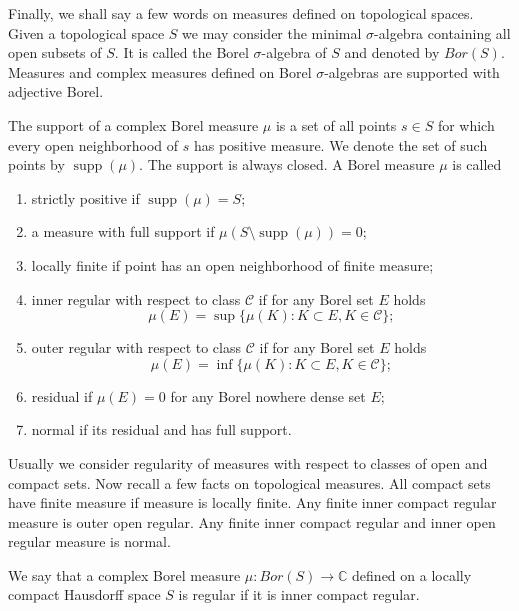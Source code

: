 Finally, we shall say a few words on measures defined on topological spaces.
Given a topological space $S$ we may consider the minimal $\sigma$-algebra
containing all open subsets of $S$. It is called the Borel $\sigma$-algebra of
$S$ and denoted by $Bor(S)$. Measures and complex measures defined on Borel
$\sigma$-algebras are supported with adjective Borel.

The support of a complex Borel measure $\mu$ is a set of all points
$s\in S$ for which every open neighborhood of $s$ has positive measure. We
denote the set of such points by $\operatorname{supp}(\mu)$. The support is
always closed. A Borel measure $\mu$ is called
\begin{enumerate}[label = (\roman*)]
  \item strictly positive if $\operatorname{supp}(\mu)=S$;

  \item a measure with full support 
  if $\mu(S\setminus\operatorname{supp}(\mu))=0$;

  \item locally finite if point has an open neighborhood of finite measure; 

  \item inner regular with respect to 
  class $\mathcal{C}$ if for any Borel set $E$ holds 
  $$
  \mu(E)=\sup \{\mu(K): K\subset E, K\in\mathcal{C} \};
  $$

  \item outer regular with respect to 
  class $\mathcal{C}$ if for any Borel set $E$ holds 
  $$
  \mu(E)=\inf \{\mu(K): K\subset E, K\in\mathcal{C} \};
  $$

  \item residual if $\mu(E)=0$ for any Borel nowhere dense set $E$;

  \item normal if its residual and has full support.
\end{enumerate}

Usually we consider regularity of measures with respect to classes of open and
compact sets. Now recall a few facts on topological measures. All compact sets 
have finite measure if measure is locally finite. Any finite inner compact 
regular measure is outer open regular. Any finite inner compact regular and
inner open regular measure is normal. 

We say that a complex Borel measure $\mu:Bor(S)\to\mathbb{C}$ defined on a 
locally compact Hausdorff space $S$ is regular if it is inner compact regular.  

